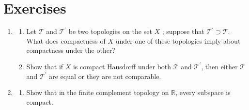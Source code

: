 \section*{Exercises}
\begin{enumerate}[itemsep=0.4em, parsep=0pt, topsep=0pt, partopsep=0pt, leftmargin=*, label=\arabic*., ref=\arabic*]
\item
 \begin{enumerate}[itemsep=0.2em, parsep=0pt, topsep=0pt, partopsep=0pt, leftmargin=*, label=(\alph*), align=left]
 \item Let \(\mathcal{T}\) and \(\mathcal{T}^{\prime }\) be two topologies on the set \(X\) ; suppose that \(\mathcal{T}^{\prime } \supset \mathcal{T}\). What does compactness of \(X\) under one of these topologies imply about compactness under the other?

 \item Show that if \(X\) is compact Hausdorff under both \(\mathcal{T}\) and \(\mathcal{T}^{\prime }\), then either \(\mathcal{T}\) and \(\mathcal{T}^{\prime }\) are equal or they are not comparable.
 \end{enumerate}
\item
 \begin{enumerate}[itemsep=0.2em, parsep=0pt, topsep=0pt, partopsep=0pt, leftmargin=*, label=(\alph*), align=left]
 \item Show that in the finite complement topology on \(\mathbb{R}\), every subspace is compact.


\end{enumerate}
\end{enumerate}

